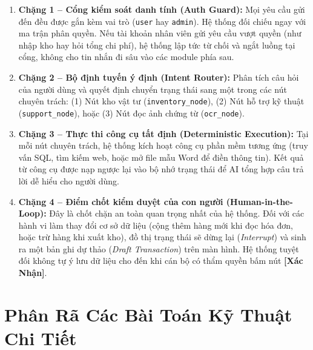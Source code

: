 \documentclass[11pt,a4paper]{article}
\begin{document}
\begin{enumerate}
    \item \textbf{Chặng 1 -- Cổng kiểm soát danh tính (Auth Guard):} \newline
    Mọi yêu cầu gửi đến đều được gắn kèm vai trò (\texttt{user} hay \texttt{admin}). Hệ thống đối chiếu ngay với ma trận phân quyền. Nếu tài khoản nhân viên gửi yêu cầu vượt quyền (như nhập kho hay hỏi tổng chi phí), hệ thống lập tức từ chối và ngắt luồng tại cổng, không cho tin nhắn đi sâu vào các module phía sau.
    
    \item \textbf{Chặng 2 -- Bộ định tuyến ý định (Intent Router):} \newline
    Phân tích câu hỏi của người dùng và quyết định chuyển trạng thái sang một trong các nút chuyên trách: (1) Nút kho vật tư (\texttt{inventory\_node}), (2) Nút hỗ trợ kỹ thuật (\texttt{support\_node}), hoặc (3) Nút đọc ảnh chứng từ (\texttt{ocr\_node}).

    \item \textbf{Chặng 3 -- Thực thi công cụ tất định (Deterministic Execution):} \newline
    Tại mỗi nút chuyên trách, hệ thống kích hoạt công cụ phần mềm tương ứng (truy vấn SQL, tìm kiếm web, hoặc mở file mẫu Word để điền thông tin). Kết quả từ công cụ được nạp ngược lại vào bộ nhớ trạng thái để AI tổng hợp câu trả lời dễ hiểu cho người dùng.

    \item \textbf{Chặng 4 -- Điểm chốt kiểm duyệt của con người (Human-in-the-Loop):} \newline
    Đây là chốt chặn an toàn quan trọng nhất của hệ thống. Đối với các hành vi làm thay đổi cơ sở dữ liệu (cộng thêm hàng mới khi đọc hóa đơn, hoặc trừ hàng khi xuất kho), đồ thị trạng thái sẽ dừng lại (\textit{Interrupt}) và sinh ra một bản ghi dự thảo (\textit{Draft Transaction}) trên màn hình. Hệ thống tuyệt đối không tự ý lưu dữ liệu cho đến khi cán bộ có thẩm quyền bấm nút \textbf{[Xác Nhận]}.
\end{enumerate}

\vspace{0.3cm}

\section{Phân Rã Các Bài Toán Kỹ Thuật Chi Tiết}
\end{document}
